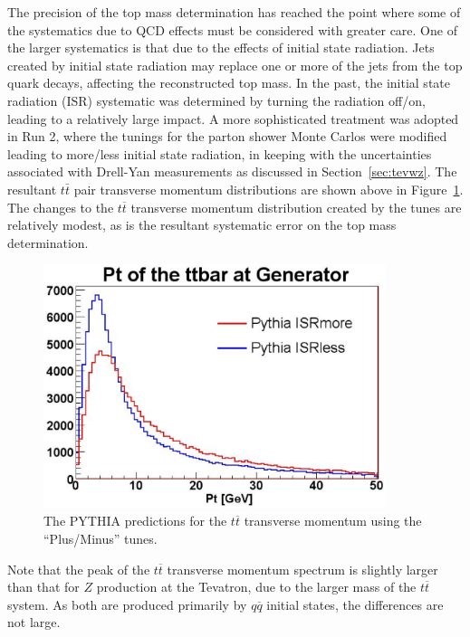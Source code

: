 \documentclass[12pt]{iopart}
\begin{document}
The precision of the top mass determination has reached the point where some of the systematics due to QCD effects
must be considered with greater care. One of the larger systematics is that due to the effects of initial state
radiation. Jets created by initial state radiation may replace one or more of the jets from the top quark decays,
affecting the reconstructed top mass. In the past, the initial state radiation (ISR) systematic was determined
by turning the radiation
off/on, leading to a relatively large impact. A more sophisticated treatment was adopted in Run 2, where the tunings
for the parton shower Monte Carlos were modified leading to more/less initial state radiation, in keeping with the
uncertainties associated with Drell-Yan measurements as discussed in Section~\ref{sec:tevwz}. The resultant
$t\bar{t}$ pair transverse momentum distributions are shown above in Figure~\ref{fig:pairpt}.  The changes to the
$t\overline{t}$ transverse momentum distribution created by the tunes are relatively modest, as is the resultant
systematic error on the top mass determination. 
%
\begin{figure}[t]
\begin{center}
\includegraphics[width=10cm]{pt_ttbar_ttopbe-ce_gen.eps}
\end{center}
\vspace*{-0.5cm}
\caption{
The  PYTHIA predictions for the $t\overline{t}$ transverse momentum using the ``Plus/Minus'' tunes.
\label{fig:pairpt}}
\end{figure}
%

Note that the peak of the $t\overline{t}$ transverse momentum spectrum is slightly larger than that for $Z$
production at the Tevatron, due to the larger mass of the $t\overline{t}$ system. As both are produced primarily by
$q\overline{q}$ initial states, the differences are not large.
\end{document}
